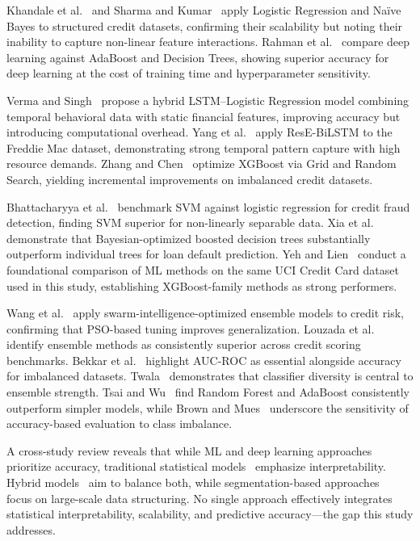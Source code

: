 \documentclass[sigconf]{acmart}
\begin{document}
Khandale et al.~\cite{khandale2023credit} and Sharma and Kumar~\cite{sharma2023logistic} apply Logistic Regression and Na\"{i}ve Bayes to structured credit datasets, confirming their scalability but noting their inability to capture non-linear feature interactions. Rahman et al.~\cite{rahman2024comparative} compare deep learning against AdaBoost and Decision Trees, showing superior accuracy for deep learning at the cost of training time and hyperparameter sensitivity.

Verma and Singh~\cite{verma2025hybrid} propose a hybrid LSTM--Logistic Regression model combining temporal behavioral data with static financial features, improving accuracy but introducing computational overhead. Yang et al.~\cite{yang2023resilstm} apply ResE-BiLSTM to the Freddie Mac dataset, demonstrating strong temporal pattern capture with high resource demands. Zhang and Chen~\cite{zhang2025xgboost} optimize XGBoost via Grid and Random Search, yielding incremental improvements on imbalanced credit datasets.

Bhattacharyya et al.~\cite{bhattacharyya2011naive} benchmark SVM against logistic regression for credit fraud detection, finding SVM superior for non-linearly separable data. Xia et al.~\cite{xia2017boosted} demonstrate that Bayesian-optimized boosted decision trees substantially outperform individual trees for loan default prediction. Yeh and Lien~\cite{yeh2009comparisons} conduct a foundational comparison of ML methods on the same UCI Credit Card dataset used in this study, establishing XGBoost-family methods as strong performers.

Wang et al.~\cite{wang2013credit} apply swarm-intelligence-optimized ensemble models to credit risk, confirming that PSO-based tuning improves generalization. Louzada et al.~\cite{louzada2016classification} identify ensemble methods as consistently superior across credit scoring benchmarks. Bekkar et al.~\cite{bekkar2013evaluation} highlight AUC-ROC as essential alongside accuracy for imbalanced datasets. Twala~\cite{twala2008missing} demonstrates that classifier diversity is central to ensemble strength. Tsai and Wu~\cite{tsai2008using} find Random Forest and AdaBoost consistently outperform simpler models, while Brown and Mues~\cite{brown2012experiment} underscore the sensitivity of accuracy-based evaluation to class imbalance.

A cross-study review reveals that while ML and deep learning approaches~\cite{abi2025ml,sharma2024deep,rahman2024comparative} prioritize accuracy, traditional statistical models~\cite{sharma2023logistic} emphasize interpretability. Hybrid models~\cite{verma2025hybrid} aim to balance both, while segmentation-based approaches~\cite{gu2024lasca} focus on large-scale data structuring. No single approach effectively integrates statistical interpretability, scalability, and predictive accuracy---the gap this study addresses.
\end{document}
